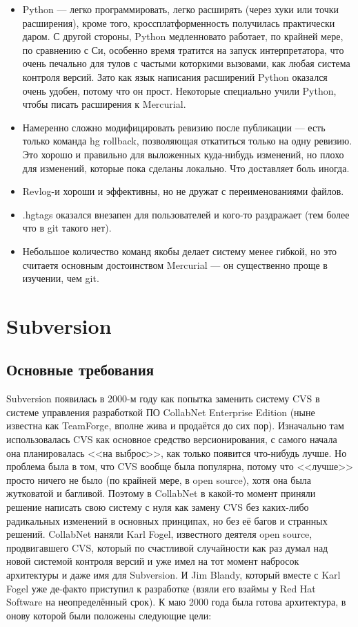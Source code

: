\documentclass[a5paper]{article}
\begin{document}
\begin{itemize}
	\item Python --- легко программировать, легко расширять (через хуки или точки расширения), кроме того, кроссплатформенность получилась практически даром. С другой стороны, Python медленновато работает, по крайней мере, по сравнению с Си, особенно время тратится на запуск интерпретатора, что очень печально для тулов с частыми которкими вызовами, как любая система контроля версий. Зато как язык написания расширений Python оказался очень удобен, потому что он прост. Некоторые специально учили Python, чтобы писать расширения к Mercurial.
	\item Намеренно сложно модифицировать ревизию после публикации --- есть только команда hg rollback, позволяющая откатиться только на одну ревизию. Это хорошо и правильно для выложенных куда-нибудь изменений, но плохо для изменений, которые пока сделаны локально. Что доставляет боль иногда.
	\item Revlog-и хороши и эффективны, но не дружат с переименованиями файлов.
	\item .hgtags оказался внезапен для пользователей и кого-то раздражает (тем более что в git такого нет).
	\item Небольшое количество команд якобы делает систему менее гибкой, но это считаетя основным достоинством Mercurial --- он существенно проще в изучении, чем git.
\end{itemize}

\section{Subversion}

\subsection{Основные требования}

Subversion появилась в 2000-м году как попытка заменить систему CVS в системе управления разработкой ПО CollabNet Enterprise Edition (ныне известна как TeamForge, вполне жива и продаётся до сих пор). Изначально там использовалась CVS как основное средство версионирования, с самого начала она планировалась <<на выброс>>, как только появится что-нибудь лучше. Но проблема была в том, что CVS вообще была популярна, потому что <<лучше>> просто ничего не было (по крайней мере, в open source), хотя она была жутковатой и багливой. Поэтому в CollabNet в какой-то момент приняли решение написать свою систему с нуля как замену CVS без каких-либо радикальных изменений в основных принципах, но без её багов и странных решений. CollabNet наняли Karl Fogel, известного деятеля open source, продвигавшего CVS, который по счастливой случайности как раз думал над новой системой контроля версий и уже имел на тот момент набросок архитектуры и даже имя для Subversion. И Jim Blandy, который вместе с Karl Fogel уже де-факто приступил к разработке (взяли его взаймы у Red Hat Software на неопределённый срок). К маю 2000 года была готова архитектура, в онову которой были положены следующие цели:
\end{document}
